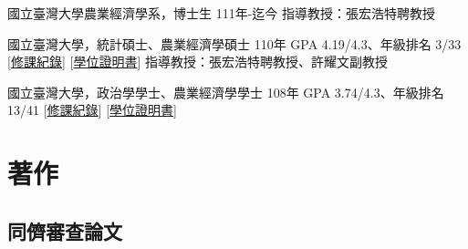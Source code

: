 \documentclass[11pt,letterpaper]{article}
\begin{document}
國立臺灣大學農業經濟學系，博士生 \hfill 111年-迄今
\newline 指導教授：張宏浩特聘教授

國立臺灣大學，統計碩士、農業經濟學碩士 \hfill 110年 \newline GPA
4.19/4.3、年級排名 3/33
{[}\href{https://yyliou.github.io/yyliou/cv/doc/ms-transcript-zh.pdf}{修課紀錄}{]}
{[}\href{https://yyliou.github.io/yyliou/cv/doc/ms-certificate-zh.pdf}{學位證明書}{]}
\newline 指導教授：張宏浩特聘教授、許耀文副教授

國立臺灣大學，政治學學士、農業經濟學學士 \hfill 108年 \newline GPA
3.74/4.3、年級排名 13/41
{[}\href{https://yyliou.github.io/yyliou/cv/doc/bs-transcript-zh.pdf}{修課紀錄}{]}
{[}\href{https://yyliou.github.io/yyliou/cv/doc/bs-certificate-zh.pdf}{學位證明書}{]}

\section{著作}\label{ux8457ux4f5c}

\subsection{\texorpdfstring{\textbf{同儕審查論文}}{同儕審查論文}}\label{ux540cux5115ux5be9ux67e5ux8ad6ux6587}
\end{document}
